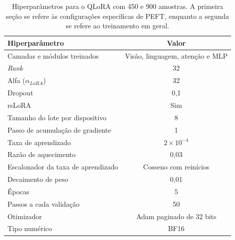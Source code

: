 \begin{table}[ht]
    \caption{\small Hiperparâmetros para o \ac{QLoRA} com 450 e 900 amostras. A primeira seção se refere às
    configurações
    específicas de \ac{PEFT}, enquanto a
    segunda se refere ao treinamento em geral.}
    \centering
    \begin{tabular}{l|c}
        \hline
        Hiperparâmetro                             & Valor                                  \\ \hline
        Camadas e módulos treinados                & Visão, linguagem, atenção e \ac{MLP}   \\
        \textit{Rank}                              & 32                                     \\
        Alfa (\begin{math}\alpha_{LoRA}\end{math}) & 32                                     \\
        Dropout                                    & 0,1                                    \\
        \ac{rsLoRA}                                & Sim                                    \\ \hline
        Tamanho do lote por dispositivo            & 8                                      \\
        Passo de acumulação de gradiente           & 1                                      \\
        Taxa de aprendizado                        & \begin{math}2 \times 10^{-4}\end{math} \\
        Razão de aquecimento                       & 0,03                                   \\
        Escalonador da taxa de aprendizado         & Cosseno com reinícios                  \\
        Decaimento de peso                         & 0,01                                   \\
        Épocas                                     & 5                                      \\
        Passos a cada validação                    & 50                                     \\
        Otimizador                                 & \ac{Adam} paginado de 32 bits          \\
        Tipo numérico                              & \ac{BF16}                              \\ \hline
    \end{tabular}
    \label{tab:qlora_500_config}
\end{table}

